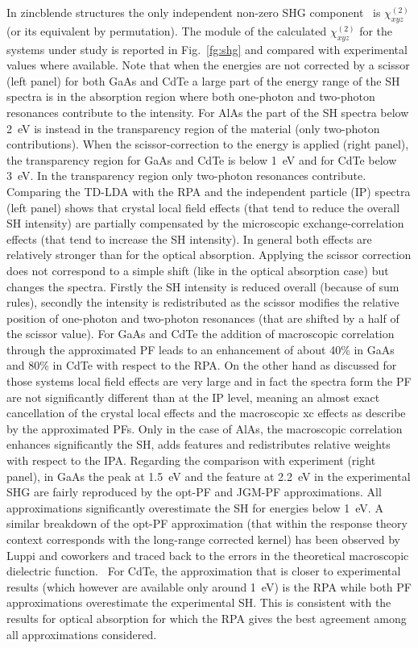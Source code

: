 In zincblende structures the only independent non-zero SHG component~\cite{boyd} is $\chi^{(2)}_{xyz}$ (or its equivalent by permutation). The module of the calculated $\chi^{(2)}_{xyz}$ for the systems under study is reported in Fig.~\ref{fg:shg} and compared with experimental values where available.
Note that when the energies are not corrected by a scissor (left panel) for both GaAs and CdTe a large part of the energy range of the SH spectra is in the absorption region where both one-photon and two-photon resonances contribute to the intensity.  For AlAs the part of the SH spectra below 2~eV is instead in the transparency region of the material (only two-photon contributions).
When the scissor-correction to the energy is applied (right panel), the transparency region for GaAs and CdTe is below 1~eV and for CdTe below 3~eV. In the transparency region only two-photon resonances contribute. 
Comparing the TD-LDA with the RPA and the independent particle (IP)  spectra (left panel) shows that crystal local field effects (that tend to reduce the overall SH intensity) are partially compensated by the microscopic exchange-correlation effects (that tend to increase the SH intensity). In general both effects are relatively stronger than for the optical absorption. Applying the scissor correction does not correspond to a simple shift (like in the optical absorption case) but changes the spectra. Firstly the SH intensity is reduced overall (because of sum rules), secondly the intensity is redistributed as the scissor modifies the relative position of one-photon and two-photon resonances (that are shifted by a half of the scissor value). For GaAs and CdTe the addition of macroscopic correlation through the approximated PF leads to an enhancement of about 40\% in GaAs and 80\% in CdTe with respect to the RPA. On the other hand as discussed for those systems local field effects are very large and in fact the spectra form the PF are not significantly different than at the IP level, meaning an almost exact cancellation of the crystal local effects and the macroscopic xc effects as describe by the approximated PFs. Only in the case of AlAs, the macroscopic correlation enhances significantly the SH, adds features and redistributes relative weights with respect to the IPA. 
Regarding the comparison with experiment (right panel), in GaAs the peak at 1.5~eV and the feature at 2.2~eV in the experimental SHG are fairly reproduced by the opt-PF and  JGM-PF approximations. All approximations significantly overestimate the SH for energies below 1~eV. A similar breakdown of the opt-PF approximation (that within the response theory context corresponds with the long-range corrected kernel) has been observed by Luppi and coworkers and traced back to the errors in the theoretical macroscopic dielectric function.~\cite{PhysRevB.82.235201} For CdTe, the approximation that is closer to experimental results (which however are available only around 1~eV) is the RPA while both PF approximations overestimate the experimental SH. This is consistent with the results for optical absorption for which the RPA gives the best agreement among all approximations considered.
